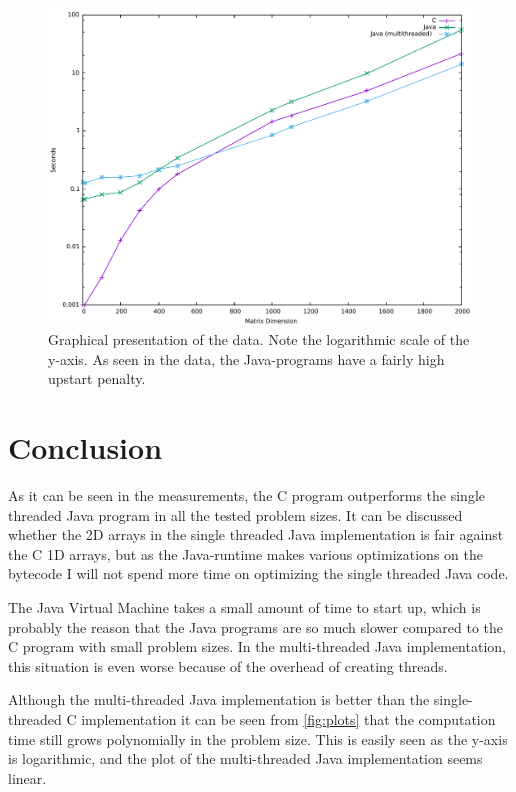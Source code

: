\documentclass{article}
\begin{document}
	\begin{figure}[H]
		\includegraphics[width=\textwidth]{AppliedAlgorithmsMatrixMultiplicationPlots.pdf}
		\caption{Graphical presentation of the data. Note the logarithmic scale of the y-axis. As seen in the data, the Java-programs have a fairly high upstart penalty.}
		\label{fig:plots}
	\end{figure}

	\section{Conclusion}
	As it can be seen in the measurements, the C program outperforms the single threaded Java program in all the tested problem sizes. It can be discussed whether the 2D arrays in the single threaded Java implementation is fair against the C 1D arrays, but as the Java-runtime makes various optimizations on the bytecode I will not spend more time on optimizing the single threaded Java code.
	
	The Java Virtual Machine takes a small amount of time to start up, which is probably the reason that the Java programs are so much slower compared to the C program with small problem sizes. In the multi-threaded Java implementation, this situation is even worse because of the overhead of creating threads.

	Although the multi-threaded Java implementation is better than the single-threaded C implementation it can be seen from \autoref{fig:plots} that the computation time still grows polynomially in the problem size. This is easily seen as the y-axis is logarithmic, and the plot of the multi-threaded Java implementation seems linear.


\end{document}
